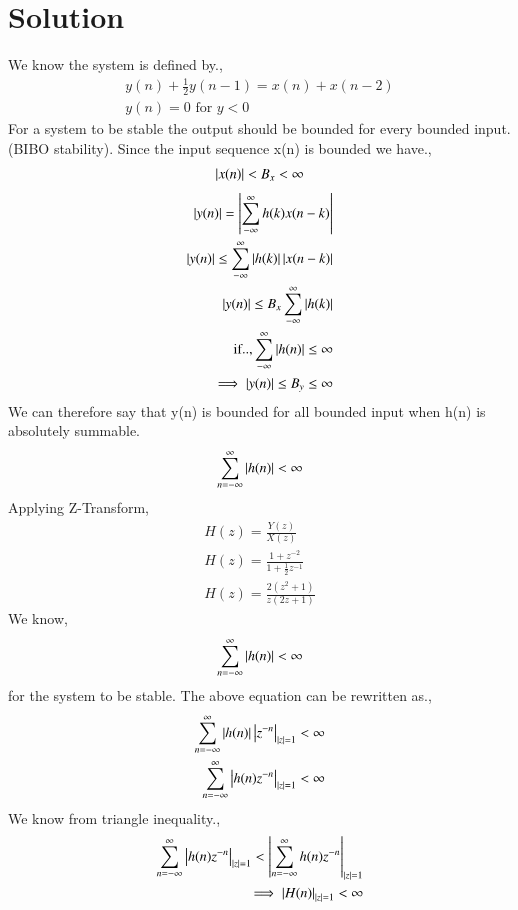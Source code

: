\documentclass[journal,12pt,twocolumn]{IEEEtran}
\begin{document}
\section{Solution}
We know the system is defined by.,
\begin{align}
\label{eq:system}
y(n)+\frac{1}{2}y(n-1) = x(n)+x(n-2) \\
y(n)=0 \text{ for }y<0
\end{align}
For a system to be stable the output should be bounded for every bounded input.(BIBO stability).
Since the input sequence x(n) is bounded we have.,
\begin{align}
    \left\vert x(n)\right\vert<B_x<\infty
\end{align}
\begin{align}
 \left\vert y(n)\right\vert = \left\vert\sum_{-\infty}^{\infty}h(k)x(n-k)\right\vert\\
 \left\vert y(n)\right\vert \leq \sum_{-\infty}^{\infty}\left\vert h(k)\right\vert\left\vert x(n-k)\right\vert\\
 \left\vert y(n)\right\vert \leq B_x\sum_{-\infty}^{\infty}\left\vert h(k)\right\vert\\
 \text{if..,}
 \sum_{-\infty}^{\infty}\left\vert h(n)\right\vert \leq 
\infty \\
\implies \left\vert y(n)\right\vert \leq B_y \leq \infty 
\end{align}
We can therefore say that y(n) is bounded for all bounded input when h(n) is absolutely summable.\\
\begin{align}
\sum_{n=-\infty}^{\infty} \left\vert h(n)\right\vert < \infty
\end{align}
Applying Z-Transform, 
\begin{align}
H(z) = \frac{Y(z)}{X(z)}\\
H(z) = \frac{1+z^{-2}}{1+\frac{1}{2}z^{-1}}\\
H(z) = \frac{2(z^2+1)}{z(2z+1)} \label{eq:Z Transform}
\end{align}
We know,
\begin{align}
    \sum_{n=-\infty}^{\infty}\left\vert h(n)\right\vert<\infty
\end{align}
for the system to be stable.
The above equation can be rewritten as.,
\begin{align}
    \sum_{n=-\infty}^{\infty}\left\vert h(n)\right\vert\left\vert z^{-n}\right\vert_{\left\vert z\right\vert=1}<\infty\\
    \sum_{n=-\infty}^{\infty}\left\vert h(n)z^{-n}\right\vert_{\left\vert z\right\vert=1}<\infty
\end{align}
We know from triangle inequality.,
\begin{align}
   \sum_{n=-\infty}^{\infty}\left\vert h(n)z^{-n}\right\vert_{\left\vert z\right\vert=1}<\left\vert\sum_{n=-\infty}^{\infty}h(n)z^{-n}\right\vert_{\left\vert z\right\vert=1} \\
   \implies \left\vert H(n)\right\vert_{\left\vert z\right\vert=1}<\infty
\end{align}
\end{document}
